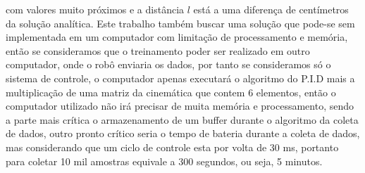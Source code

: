 com valores muito próximos e a distância $l$ está a uma diferença de
centímetros da solução analítica. Este trabalho também buscar uma solução
que pode-se sem implementada em um computador com limitação de
processamento e memória, então se consideramos que o treinamento poder ser
realizado em outro computador, onde o robô enviaria os dados,
por tanto se consideramos só o sistema de controle, o computador apenas
executará o algoritmo do  P.I.D mais a multiplicação de uma matriz da
cinemática que contem 6 elementos, então o computador utilizado não irá precisar de muita memória e processamento,
sendo a parte mais crítica o armazenamento de um buffer durante o algoritmo
da coleta de dados, outro pronto crítico seria o tempo de bateria durante
a coleta de dados, mas considerando que um ciclo de controle esta por volta
de 30 ms, portanto para coletar 10 mil amostras equivale a 300 segundos, ou
seja, 5 minutos.